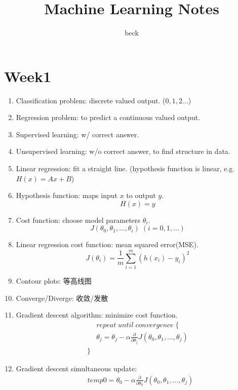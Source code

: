 \documentclass[UTF8]{ctexart}
\begin{document}
\title{Machine Learning Notes}
\author{beck}
\maketitle
\vfill
\clearpage
\section*{Week1}
\begin{enumerate}
    \item Classification problem: discrete valued output. ($0,1,2\ldots$)
    \item Regression problem: to predict a continuous valued output.
    \item Supervised learning: w/ correct answer.
    \item Unsupervised learning: w/o correct answer, to find structure in data.
    \item Linear regression: fit a straight line. (hypothesis function is linear, e.g.$H(x)=Ax+B$)
    \item Hypothesis function: maps input $x$ to output $y$.
          \[
              H(x) = y
          \]
    \item Cost function: choose model parameters $\theta_i$.
          \[
              J(\theta_0, \theta_1, \ldots, \theta_i)\; (i = 0, 1, \ldots)
          \]
    \item Linear regression cost function: mean squared error(MSE).
          \[
              J(\theta_i) = \frac{1}{m} \sum_{i=1}^{m} (h(x_i) - y_i)^2
          \]
    \item Contour plots: 等高线图
    \item Converge/Diverge: 收敛/发散
    \item Gradient descent algorithm: minimize cost function.
          \[
              \begin{aligned}
                   & repeat\; until\; convergence\; \{                                                                      \\
                   & \theta_j = \theta_j - \alpha \frac{\partial}{\partial\theta_j} J(\theta_0, \theta_1, \ldots, \theta_j) \\
                  \}
              \end{aligned}
          \]
    \item Gradient descent simultaneous update:
          \[
              \begin{aligned}
                   & temp0 = \theta_0 - \alpha \frac{\partial}{\partial\theta_0} J(\theta_0, \theta_1, \ldots, \theta_j) \\

\end{aligned}\]
\end{enumerate}
\end{document}
